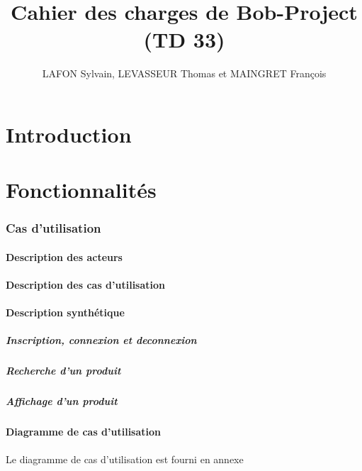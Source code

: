 \documentclass[10pt,a4paper]{article}
\title{Cahier des charges de Bob-Project (TD 33)}
\author{LAFON Sylvain, LEVASSEUR Thomas et MAINGRET François}
\begin{document}
	\maketitle
	\tableofcontents
	\newpage
	\part{Introduction}
		
	\newpage
	\part{Fonctionnalités}
		\section{Cas d'utilisation}
			\subsection{Description des acteurs}
				
			\subsection{Description des cas d'utilisation}
				
			\subsection{Description synthétique}
				\subsubsection{Inscription, connexion et deconnexion}
					
				\subsubsection{Recherche d'un produit}
					
				\subsubsection{Affichage d'un produit}
					
			\subsection{Diagramme de cas d'utilisation}
				Le diagramme de cas d'utilisation est fourni en annexe
				\newline
					
\end{document}

